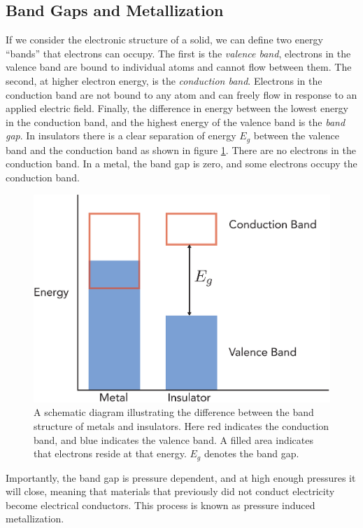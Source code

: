 \subsection{Band Gaps and Metallization}
If we consider the electronic structure of a solid, we can define two energy ``bands'' that electrons can occupy. The first is the \emph{valence band}, electrons in the valence band are bound to individual atoms and cannot flow between them. The second, at higher electron energy, is the \emph{conduction band}. Electrons in the conduction band are not bound to any atom and can freely flow in response to an applied electric field. Finally, the difference in energy between the lowest energy in the conduction band, and the highest energy of the valence band is the \emph{band gap}. In insulators there is a clear separation of energy $E_g$ between the valence band and the conduction band as shown in figure \ref{fig:bandgap}. There are no electrons in the conduction band. In a metal, the band gap is zero, and some electrons occupy the conduction band.
\begin{figure}
	\centering
        \includegraphics[width=.6\textwidth]{Chapter3/Figures/EnergyGap.eps}
        \caption{A schematic diagram illustrating the difference between the band structure of metals and insulators. Here red indicates the conduction band, and blue indicates the valence band. A filled area indicates that electrons reside at that energy. $E_g$ denotes the band gap.}
        \label{fig:bandgap}
\end{figure}
Importantly, the band gap is pressure dependent, and at high enough pressures it will close, meaning that materials that previously did not conduct electricity become electrical conductors. This process is known as pressure induced metallization.

